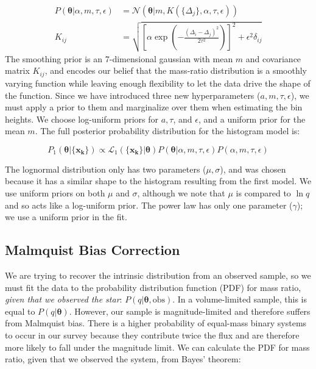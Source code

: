 \documentclass{emulateapj}
\renewcommand{\vec}[1]{\bm{#1}}
\begin{document}
\begin{align}
P(\vec{\theta}| \alpha, m, \tau, \epsilon) &= \mathcal{N}(\vec{\theta} | m, K(\{\Delta_j\}, \alpha, \tau, \epsilon)) \\
K_{ij} &= \sqrt{\left[\alpha \exp{\left(-\frac{(\Delta_i - \Delta_j)^2}{2\tau^2}\right)}\right]^2 + \epsilon^2 \delta_{ij}}
\end{align}
The smoothing prior is an 7-dimensional gaussian with mean $m$ and covariance matrix $K_{ij}$, and encodes our belief that the mass-ratio distribution is a smoothly varying function while leaving enough flexibility to let the data drive the shape of the function. Since we have introduced three new hyperparameters ($a, m, \tau, \epsilon$), we must apply a prior to them and marginalize over them when estimating the bin heights. We choose log-uniform priors for $a, \tau$, and $\epsilon$, and a uniform prior for the mean $m$. The full posterior probability distribution for the histogram model is:

\begin{equation}
P_1(\vec{\theta} | \{\vec{x_k}\}) \propto \mathcal{L}_1(\{\vec{x_k}\}| \vec{\theta}) P(\vec{\theta}| \alpha, m, \tau, \epsilon) P(\alpha, m, \tau, \epsilon)
\end{equation}

The lognormal distribution only has two parameters ($\mu, \sigma$), and was chosen because it has a similar shape to the histogram resulting from the first model. We use uniform priors on both $\mu$ and $\sigma$, although we note that $\mu$ is compared to $\ln{q}$ and so acts like a log-uniform prior. The power law has only one parameter ($\gamma$); we use a uniform prior in the fit.

\subsection{Malmquist Bias Correction}

We are trying to recover the intrinsic distribution from an observed sample, so we must fit the data to the probability distribution function (PDF) for mass ratio, \emph{given that we observed the star}: $P(q|\vec{\theta}, \mathrm{obs})$. In a volume-limited sample, this is equal to $P(q|\vec{\theta})$. However, our sample is magnitude-limited and therefore suffers from Malmquist bias. There is a higher probability of equal-mass binary systems to occur in our survey because they contribute twice the flux and are therefore more likely to fall under the magnitude limit. We can calculate the PDF for mass ratio, given that we observed the system, from Bayes' theorem:
\end{document}
